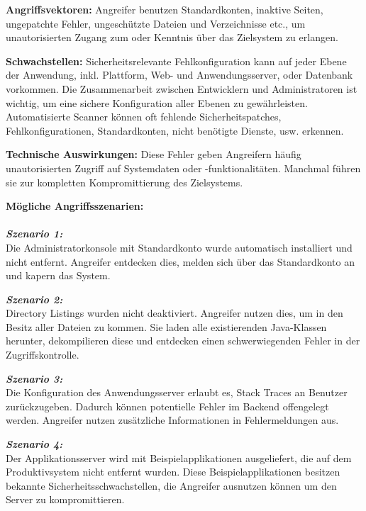 \textbf{Angriffsvektoren:} Angreifer benutzen Standardkonten, inaktive Seiten, ungepatchte Fehler, ungeschützte Dateien und Verzeichnisse etc., um unautorisierten Zugang zum oder Kenntnis
über das Zielsystem zu erlangen\cite[12]{owasp17top10}.

\textbf{Schwachstellen:} Sicherheitsrelevante Fehlkonfiguration
kann auf jeder Ebene der Anwendung, inkl. Plattform, Web- und Anwendungsserver, oder Datenbank vorkommen. Die Zusammenarbeit zwischen Entwicklern und Administratoren ist wichtig, um eine
sichere Konfiguration aller Ebenen zu gewährleisten. Automatisierte Scanner können oft fehlende Sicherheitspatches,
Fehlkonfigurationen, Standardkonten, nicht benötigte Dienste, usw. erkennen\cite[12]{owasp17top10}.

\textbf{Technische Auswirkungen:} Diese Fehler geben Angreifern häufig unautorisierten Zugriff auf Systemdaten oder -funktionalitäten. Manchmal führen sie zur kompletten Kompromittierung des Zielsystems\cite[12]{owasp17top10}.

\textbf{Mögliche Angriffsszenarien:}\\
\\
\textbf{\textit{Szenario 1:}}\\
Die Administratorkonsole mit Standardkonto
wurde automatisch installiert und nicht entfernt. Angreifer
entdecken dies, melden sich über das Standardkonto an und
kapern das System\cite[12]{owasp17top10}.

\textbf{\textit{Szenario 2:}}\\
Directory Listings wurden nicht deaktiviert.
Angreifer nutzen dies, um in den Besitz aller Dateien zu
kommen. Sie laden alle existierenden Java-Klassen herunter,
dekompilieren diese und entdecken einen schwerwiegenden
Fehler in der Zugriffskontrolle\cite[12]{owasp17top10}.

\textbf{\textit{Szenario 3:}}\\
Die Konfiguration des Anwendungsserver erlaubt
es, Stack Traces an Benutzer zurückzugeben. Dadurch können
potentielle Fehler im Backend offengelegt werden. Angreifer
nutzen zusätzliche Informationen in Fehlermeldungen aus\cite[12]{owasp17top10}.

\textbf{\textit{Szenario 4:}}\\
Der Applikationsserver wird mit Beispielapplikationen
ausgeliefert, die auf dem Produktivsystem nicht
entfernt wurden. Diese Beispielapplikationen besitzen
bekannte Sicherheitsschwachstellen, die Angreifer ausnutzen
können um den Server zu kompromittieren\cite[12]{owasp17top10}.

